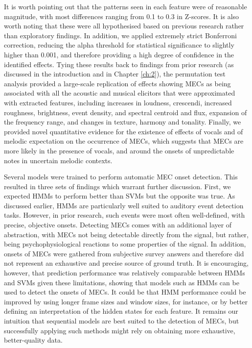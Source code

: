 It is worth pointing out that the patterns seen in each feature were of reasonable magnitude, with most differences ranging from 0.1 to 0.3 in Z-scores. It is also worth noting that these were all hypothesised based on previous research rather than exploratory findings. In addition, we applied extremely strict Bonferroni correction, reducing the alpha threshold for statistical significance to slightly higher than 0.001, and therefore providing a high degree of confidence in the identified effects. Tying these results back to findings from prior research (as discussed in the introduction and in Chapter \ref{ch:2}), the permutation test analysis provided a large-scale replication of effects showing MECs as being associated with all the acoustic and musical elicitors that were approximated with extracted features, including increases in loudness, crescendi, increased roughness, brightness, event density, and spectral centroid and flux, expansion of the frequency range, and changes in texture, harmony and tonality. Finally, we provided novel quantitative evidence for the existence of effects of vocals and of melodic expectation on the occurrence of MECs, which suggests that MECs are more likely in the presence of vocals, and around the onsets of unpredictable notes in uncertain melodic contexts.

Several models were trained to perform automatic MEC onset detection. This resulted in three sets of findings which warrant further discussion. First, we expected HMMs to perform better than SVMs but the opposite was true. As discussed earlier, HMMs are particularly well suited to auditory event detection tasks. However, in prior research, such events were most often well-defined, with precise, objective onsets. Detecting MECs comes with an additional layer of abstraction, with MECs not being detectable directly from the signal, but rather, being psychophysiological reactions to some properties of the signal. In addition, onsets of MECs were gathered from subjective survey answers and therefore did not represent an exhaustive and precise source of ground truth. It is encouraging, however, that prediction performance was relatively comparable between HMMs and SVMs given these limitations, showing that models such as HMMs can be used to detect the onsets of MECs. It could be that HMM performance could be improved by using longer frame sizes and window sizes, for instance, or by better defining an interpretation of the hidden states for each feature. It remains our intuition that sequential models are best suited to the detection of MECs, but successfully applying such methods might rely on obtaining more exhaustive, better-quality data.

